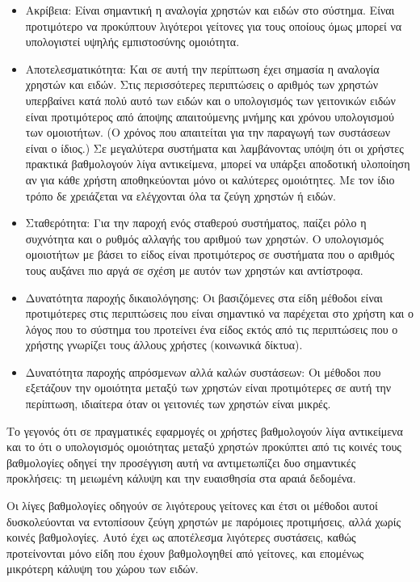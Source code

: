 \begin{itemize}
 \item Ακρίβεια: Είναι σημαντική η αναλογία χρηστών και ειδών στο σύστημα. Εί\-ναι προτιμότερο να προκύπτουν λιγότεροι γείτονες για τους οποίους όμως μπορεί να υπολογιστεί υψηλής εμπιστοσύνης ομοιότητα.
 \item Αποτελεσματικότητα: Και σε αυτή την περίπτωση έχει σημασία η αναλογία χρηστών και ειδών. Στις περισσότερες περιπτώσεις ο αριθμός των χρηστών υπερβαίνει κατά πολύ αυτό των ειδών και ο υπολογισμός των γειτονικών ειδών είναι προτιμότερος από άποψης απαιτούμενης μνήμης και χρόνου υπολογισμού των ομοιοτήτων. (Ο χρόνος που απαιτείται για την παραγωγή των συστάσεων είναι ο ίδιος.) Σε μεγαλύτερα συστήματα και λαμβάνοντας υπόψη ότι οι χρήστες πρακτικά βαθμολογούν λίγα αντικείμενα, μπορεί να υπάρξει αποδοτική υλοποίηση αν για κάθε χρήστη αποθηκεύονται μόνο οι καλύτερες ομοιότητες. Με τον ίδιο τρόπο δε χρειάζεται να ελέγχονται όλα τα ζεύγη χρηστών ή ειδών.
 \item Σταθερότητα: Για την παροχή ενός σταθερού συστήματος, παίζει ρόλο η συχνότητα και ο ρυθμός αλλαγής του αριθμού των χρηστών. Ο υπολογισμός ομοιοτήτων με βάσει το είδος είναι προτιμότερος σε συστήματα που ο αριθμός τους αυξάνει πιο αργά σε σχέση με αυτόν των χρηστών και αντίστροφα. 
 \item Δυνατότητα παροχής δικαιολόγησης: Οι βασιζόμενες στα είδη μέθοδοι είναι προτιμότερες στις περιπτώσεις που είναι σημαντικό να παρέχεται στο χρήστη και ο λόγος που το σύστημα του προτείνει ένα είδος εκτός από τις περιπτώσεις που ο χρήστης γνωρίζει τους άλλους χρήστες (κοινωνικά δίκτυα). 
 \item Δυνατότητα παροχής απρόσμενων αλλά καλών συστάσεων: Οι μέθοδοι που εξετάζουν την ομοιότητα μεταξύ των χρηστών είναι προτιμότερες σε αυτή την περίπτωση, ιδιαίτερα όταν οι γειτονιές των χρηστών είναι μικρές.
\end{itemize}\par
Το γεγονός ότι σε πραγματικές εφαρμογές οι χρήστες βαθμολογούν λίγα α\-ντικείμενα και το ότι ο υπολογισμός ομοιότητας μεταξύ χρηστών προκύπτει από τις κοινές τους βαθμολογίες οδηγεί την προσέγγιση αυτή να αντιμετωπίζει δυο σημαντικές προκλήσεις: τη μειωμένη κάλυψη και την ευαισθησία στα αραιά δεδομένα. \par
Οι λίγες βαθμολογίες οδηγούν σε λιγότερους γείτονες και έτσι οι μέθοδοι αυτοί δυσκολεύονται να εντοπίσουν ζεύγη χρηστών με παρόμοιες προτιμήσεις, αλλά χωρίς κοινές βαθμολογίες. Αυτό έχει ως αποτέλεσμα λιγότερες συστάσεις, καθώς προτείνονται μόνο είδη που έχουν βαθμολογηθεί από γείτονες, και επομένως μικρότερη κάλυψη του χώρου των ειδών. \par
